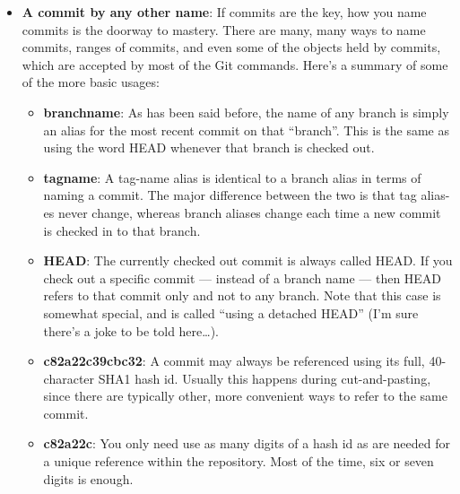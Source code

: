 \documentclass{report}
\begin{document}
\begin{itemize}
            \bigbreak \noindent 
            Another joy of the commit-based system is that you can rephrase even the most complicated version control terminology using a single vocabulary. For example, if a commit has multiple parents, it’s a “merge commit” — since it merged multiple commits into one. Or, if a commit has multiple children, it represents the ancestor of a “branch”, etc. But really there is no difference between these things to Git: to it, the world is simply a collection of commit objects, each of which holds a tree that references other trees and blobs, which store your data. Anything more complicated than this is simply a device of nomenclature.
            \bigbreak \noindent 
        \item \textbf{A commit by any other name}: If commits are the key, how you name commits is the doorway to mastery. There are many, many ways to name commits, ranges of commits, and even some of the objects held by commits, which are accepted by most of the Git commands. Here’s a summary of some of the more basic usages: 
            \begin{itemize}
                \item \textbf{branchname}: As has been said before, the name of any branch is simply an alias for the most recent commit on that “branch”. This is the same as using the word HEAD whenever that branch is checked out.
                \item \textbf{tagname}: A tag-name alias is identical to a branch alias in terms of naming a commit. The major difference between the two is that tag alias- es never change, whereas branch aliases change each time a new commit is checked in to that branch.
                \item \textbf{HEAD}: The currently checked out commit is always called HEAD. If you check out a specific commit — instead of a branch name — then HEAD refers to that commit only and not to any branch. Note that this case is somewhat special, and is called “using a detached HEAD” (I’m sure there’s a joke to be told here…).
                \item \textbf{c82a22c39cbc32}: A commit may always be referenced using its full, 40-character SHA1 hash id. Usually this happens during cut-and-pasting, since there are typically other, more convenient ways to refer to the same commit.
                \item \textbf{c82a22c}: You only need use as many digits of a hash id as are needed for a unique reference within the repository. Most of the time, six or seven digits is enough.

\end{itemize}
\end{itemize}
\end{document}
